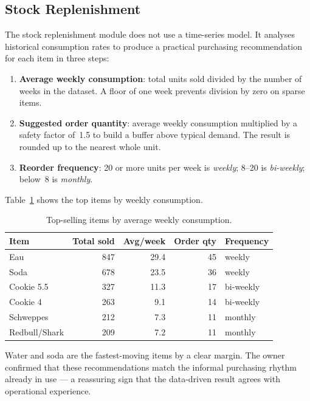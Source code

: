 \subsection{Stock Replenishment}

The stock replenishment module does not use a time-series model. It analyses
historical consumption rates to produce a practical purchasing recommendation for
each item in three steps:

\begin{enumerate}
  \item \textbf{Average weekly consumption}: total units sold divided by the number of
        weeks in the dataset. A floor of one week prevents division by zero on sparse
        items.
  \item \textbf{Suggested order quantity}: average weekly consumption multiplied by a
        safety factor of~1.5 to build a buffer above typical demand. The result is
        rounded up to the nearest whole unit.
  \item \textbf{Reorder frequency}: 20 or more units per week is \textit{weekly};
        8--20 is \textit{bi-weekly}; below~8 is \textit{monthly}.
\end{enumerate}

Table~\ref{tab:stock_top} shows the top items by weekly consumption.

\begin{table}[H]
  \centering
  \caption{Top-selling items by average weekly consumption.\label{tab:stock_top}}
  \begin{tabular}{lrrrl}
    \toprule
    \textbf{Item} & \textbf{Total sold} & \textbf{Avg/week} &
    \textbf{Order qty} & \textbf{Frequency} \\
    \midrule
    Eau            & 847 & 29.4 & 45 & weekly \\
    Soda           & 678 & 23.5 & 36 & weekly \\
    Cookie 5.5     & 327 & 11.3 & 17 & bi-weekly \\
    Cookie 4       & 263 &  9.1 & 14 & bi-weekly \\
    Schweppes      & 212 &  7.3 & 11 & monthly \\
    Redbull/Shark  & 209 &  7.2 & 11 & monthly \\
    \bottomrule
  \end{tabular}
\end{table}

Water and soda are the fastest-moving items by a clear margin. The owner confirmed that
these recommendations match the informal purchasing rhythm already in use --- a
reassuring sign that the data-driven result agrees with operational experience.

